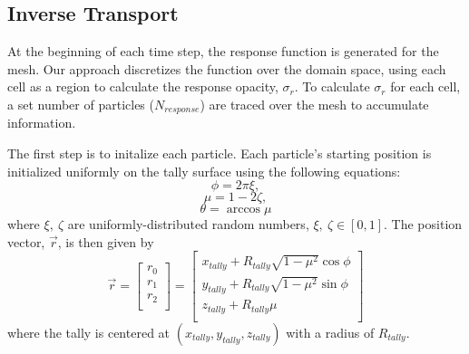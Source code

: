 \documentclass[]{article}
\begin{document}
	\subsection{Inverse Transport}
		At the beginning of each time step, the response function is generated for the mesh. Our approach discretizes the function over the domain space, using each cell as a region to calculate the response opacity, $\sigma_{r}$. To calculate $\sigma_{r}$ for each cell, a set number of particles ($N_{response}$) are traced over the mesh to accumulate information. 
		
		The first step is to initalize each particle. Each particle's starting position is initialized uniformly on the tally surface using the following equations:
		\begin{equation} \label{Eq:pos_phi}
			\phi = 2 \pi \xi ,
		\end{equation}
		\begin{equation}
			\mu = 1 - 2 \zeta,
		\end{equation}
		\begin{equation} \label{Eq:pos_cost}
			\theta = \arccos{\mu}
		\end{equation}
		where $\xi,~\zeta$ are uniformly-distributed random numbers, $\xi,~\zeta \in [0,1]$. The position vector, $\vec{r}$, is then given by
		\begin{equation}
			\vec{r} =
			\begin{bmatrix}  
				r_{0} \\
				r_{1} \\
				r_{2} \\
			\end{bmatrix}
			=
			\begin{bmatrix}  
				x_{tally} + R_{tally} \sqrt{1-\mu^{2}}  \cos{\phi}    \\
				y_{tally} + R_{tally} \sqrt{1 - \mu^{2}} \sin{\phi}    \\
				z_{tally} + R_{tally} \mu 										 \\
			\end{bmatrix}
		\end{equation}
		where the tally is centered at $(x_{tally}, y_{tally}, z_{tally})$ with a radius of $R_{tally}$. 
		
\end{document}
